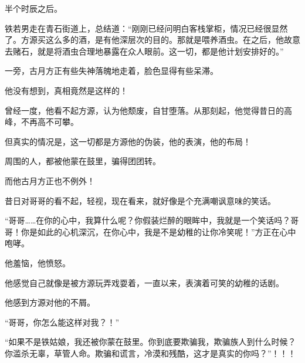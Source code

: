 \begin{this_body}
半个时辰之后。

铁若男走在青石街道上，总结道：“刚刚已经问明白客栈掌柜，情况已经很显然了。方源买这么多的酒，是有他深层次的目的。那就是喂养酒虫。在之后，他故意去赌石，就是将酒虫合理地暴露在众人眼前。这一切，都是他计划安排好的。”

一旁，古月方正有些失神落魄地走着，脸色显得有些呆滞。

他没有想到，真相竟然是这样的！

曾经一度，他看不起方源，认为他颓废，自甘堕落。从那刻起，他觉得昔日的高峰，不再高不可攀。

但真实的情况是，这一切都是方源他的伪装，他的表演，他的布局！

周围的人，都被他蒙在鼓里，骗得团团转。

而他古月方正也不例外！

昔日对哥哥的看不起，轻视，现在看来，就好像是个充满嘲讽意味的笑话。

“哥哥……在你的心中，我算什么呢？你假装烂醉的眼眸中，我就是一个笑话吗？哥哥！你是如此的心机深沉，在你心中，我是不是幼稚的让你冷笑呢！”方正在心中咆哮。

他羞恼，他愤怒。

他感觉自己就像是被方源玩弄戏耍着，一直以来，表演着可笑的幼稚的话剧。

他感到方源对他的不屑。

“哥哥，你怎么能这样对我？！”

“如果不是铁姑娘，我还被你蒙在鼓里。你到底要欺骗我，欺骗族人到什么时候？你滥杀无辜，草管人命。欺骗和谎言，冷漠和残酷，这才是真实的你吗？”！！！

\end{this_body}

